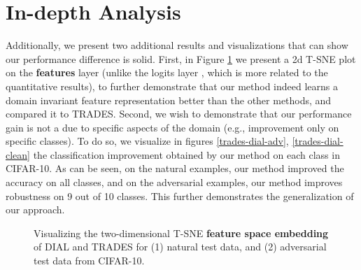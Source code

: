 \newpage
\section{In-depth Analysis}
Additionally, we present two additional results and visualizations that can show our performance difference is solid.
First, in Figure \ref{tsne-feat} we present a 2d T-SNE plot on the \textbf{features} layer (unlike the logits layer , which is more related to the quantitative results), to further demonstrate that our method indeed learns a domain invariant feature representation better than the other methods, and compared it to TRADES.
Second, we wish to demonstrate that our performance gain is not a due to specific aspects of the domain (e.g., improvement only on specific classes). To do so, we visualize in figures \ref{trades-dial-adv}, \ref{trades-dial-clean} the classification improvement obtained by our method on each class in CIFAR-10. As can be seen, on the natural examples, our method improved the accuracy on all classes, and on the adversarial examples, our method improves robustness on 9 out of 10 classes. This further demonstrates the generalization of our approach.



\begin{figure}[ht]
\centering

  
    
  \caption{Visualizing the two-dimensional T-SNE \textbf{feature space embedding} of DIAL and TRADES for (1) natural test data, and (2) adversarial test data from CIFAR-10.}
  \label{tsne-feat}
\end{figure}


